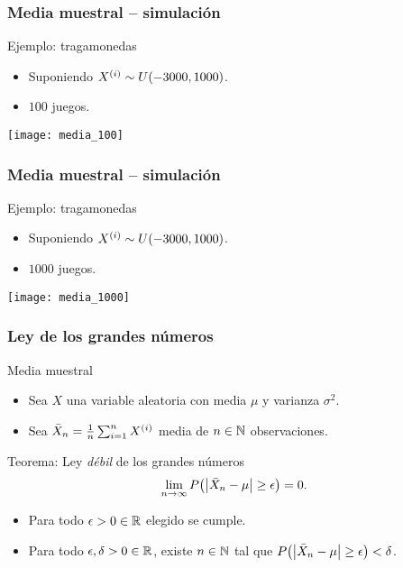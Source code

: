 \documentclass[table]{beamer}
\begin{document}
\begin{frame}
    \frametitle{Media muestral -- simulación}
    \begin{block}{Ejemplo: tragamonedas}
        \begin{itemize}
            \item Suponiendo $X^{\parens{i}} \sim \uniform{- 3000}{1000}$.
            \item $100$ juegos.
        \end{itemize}
    \end{block}
    \begin{center}
        \texttt{[image: media\_100]}
    \end{center}
\end{frame}

\begin{frame}
    \frametitle{Media muestral -- simulación}
    \begin{block}{Ejemplo: tragamonedas}
        \begin{itemize}
            \item Suponiendo $X^{\parens{i}} \sim \uniform{- 3000}{1000}$.
            \item $1000$ juegos.
        \end{itemize}
    \end{block}
    \begin{center}
        \texttt{[image: media\_1000]}
    \end{center}
\end{frame}

\begin{frame}
    \frametitle{Ley de los grandes números}
    \begin{block}{Media muestral}
        \begin{itemize}
            \item Sea $X$ una variable aleatoria con media $\mu$ y varianza $\sigma^{2}$.
            \item Sea $\bar{X}_{n} = \frac{1}{n} \sum_{i = 1}^{n} X^{\parens{i}}$ media de $n \in \mathbb{N}$ observaciones.
        \end{itemize}
    \end{block}
    \begin{block}{Teorema: Ley \emph{débil} de los grandes números}
        \begin{equation*}
            \lim_{n \rightarrow \infty} \prob{\vparens{\bar{X}_{n} - \mu} \geq \epsilon} = 0 .
        \end{equation*}
        \begin{itemize}
            \item Para todo $\epsilon > 0 \in \mathbb{R}$ elegido se cumple.
            \item Para todo $\epsilon, \delta > 0 \in \mathbb{R}$, existe $n \in \mathbb{N}$ tal que $\prob{\vparens{\bar{X}_{n} - \mu} \geq \epsilon} < \delta$.
        \end{itemize}
    \end{block}
\end{frame}
\end{document}
